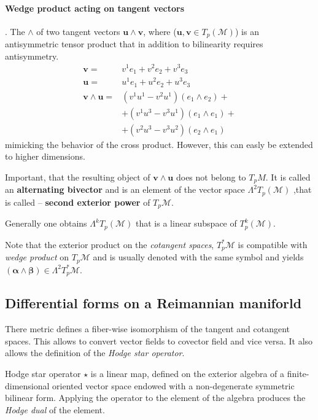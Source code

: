 \paragraph{Wedge product acting on tangent vectors}.
The $\wedge$ of two tangent vectors $\boldsymbol{u}\wedge\boldsymbol{v}$, where ($\boldsymbol{u}, \boldsymbol{v}\in T_p(\mathcal{M})$) is an antisymmetric tensor product that in addition to bilinearity requires antisymmetry. 
\begin{align}
\boldsymbol{v} =& v^1e_1 + v^2 e_2 + v^3 e_3 \\
\boldsymbol{u} =& u^1e_1 + u^2 e_2 + u^3 e_3 \\
\boldsymbol{v}\wedge\boldsymbol{u} =& (v^1u^1 - v^2u^1)(e_1\wedge e_2) + \\
& + (v^1u^3 - v^3u^1)(e_1\wedge e_1) + \\
& + (v^2u^3 - v^3u^2)(e_2\wedge e_1)
\end{align}
mimicking the behavior of the cross product. 
However, this can easly be extended to higher dimensions. 

Important, that the resulting object of $\boldsymbol{v}\wedge\boldsymbol{u}$ does not belong to $T_p M$. It is called an \textbf{alternating bivector} and is an element of the vector space $\Lambda^2 T_p (\mathcal{M})$ ,that is called -- \textbf{second exterior power} of $T_p \mathcal{M}$.

Generally one obtains $\Lambda^k T_p (\mathcal{M})$ that is a linear subspace of $T_p ^k (\mathcal{M})$.

Note that the exterior product on the \textit{cotangent spaces}, $T_p ^* \mathcal{M}$ is compatible with \textit{wedge product} on $T_p\mathcal{M}$ and is usually denoted with the same symbol and yields
$(\boldsymbol{\alpha}\wedge\boldsymbol{\beta})\in\Lambda^2 T_p ^* \mathcal{M}$.


\subsection{Differential forms on a Reimannian maniforld}

There metric defines a fiber-wise isomorphism of the tangent and cotangent spaces. This allows to convert vector fields to covector field and vice versa. It also allows the definition of the \textit{Hodge star operator}.

Hodge star operator $\star$ is a linear map, defined on the exterior algebra of a finite-dimensional oriented vector space endowed with a non-degenerate symmetric bilinear form. Applying the operator to the element of the algebra produces the \textit{Hodge dual} of the element.

